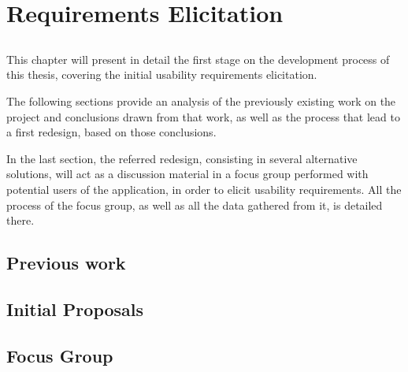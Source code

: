 \chapter{Requirements Elicitation}\label{chap:chap4}

\section*{}

This chapter will present in detail the first stage on the development process of this thesis, covering the initial usability requirements elicitation.

The following sections provide an analysis of the previously existing work on the project and conclusions drawn from that work, as well as the process that lead to a first redesign, based on those conclusions.

In the last section, the referred redesign, consisting in several alternative solutions, will act as a discussion material in a focus group performed with potential users of the application, in order to elicit usability requirements. All the process of the focus group, as well as all the data gathered from it, is detailed there.

\section{Previous work}

\section{Initial Proposals}\label{sec:initial}

\section{Focus Group}